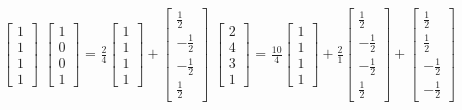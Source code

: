 \begin{tbox}
        \hspace{0.5cm}
        \scriptsize
        $\begin{bmatrix}
            1 \\
            1 \\
            1 \\
            1 
        \end{bmatrix}$
        \hspace{2cm}
        $\begin{bmatrix}
            1 \\
            0 \\
            0 \\
            1
        \end{bmatrix}$ =
        $\frac{2}{4}
        \begin{bmatrix}
            1 \\
            1 \\
            1 \\
            1
        \end{bmatrix} +
        \begin{bmatrix}
            \frac{1}{2} \\
            -\frac{1}{2} \\
            -\frac{1}{2} \\
            \frac{1}{2}
        \end{bmatrix}$
        \hspace{2cm}
        $\begin{bmatrix}
            2 \\
            4 \\
            3 \\
            1
        \end{bmatrix}$ =
        $\frac{10}{4}
        \begin{bmatrix}
            1 \\
            1 \\
            1 \\
            1
        \end{bmatrix} +
        \frac{2}{1}
        \begin{bmatrix}
            \frac{1}{2} \\
            -\frac{1}{2} \\
            -\frac{1}{2} \\
            \frac{1}{2}
        \end{bmatrix} +
        \begin{bmatrix}
            \frac{1}{2} \\
            \frac{1}{2} \\
            -\frac{1}{2} \\
            -\frac{1}{2}
        \end{bmatrix}$


\end{tbox}
